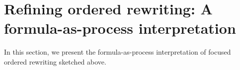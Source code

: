 









\section{Refining ordered rewriting: A formula-as-process interpretation}\label{sec:formula-as-process:interpretation}

In this section, we present the formula-as-process interpretation of focused ordered rewriting sketched above.

